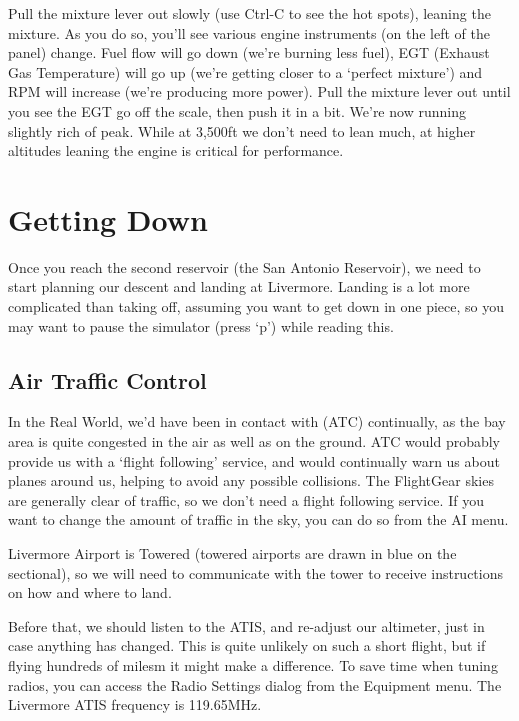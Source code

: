 Pull the mixture lever out slowly (use Ctrl-C to see the hot spots),
leaning the mixture. As you do so, you'll see various engine instruments
(on the left of the panel) change. Fuel flow will go down (we're burning
less fuel), EGT (Exhaust Gas Temperature) will go up (we're getting closer
to a `perfect mixture') and RPM will increase (we're producing more power).
Pull the mixture lever out until you see the EGT go off the scale, then
push it in a bit. We're now running slightly rich of peak. While at
3,500ft we don't need to lean much, at higher altitudes leaning the
engine is critical for performance.

\section{Getting Down}

Once you reach the second reservoir (the San Antonio Reservoir),
we need to start planning our descent and landing at Livermore.
Landing is a lot more complicated than taking off, assuming you
want to get down in one piece, so you may want to pause the
simulator (press `p') while reading this.

\subsection{Air Traffic Control}

In the Real World, we'd have been in contact with  (ATC)
continually, as the bay area is quite congested in the air as well as on the ground.
ATC would probably provide us with a `flight following' service, and would continually
warn us about planes around us, helping to avoid any possible collisions.
The FlightGear skies are generally clear of traffic, so we don't need a flight following service.
If you want to change the amount of traffic in the sky, you can do so from the AI menu.

Livermore Airport is Towered (towered airports are drawn in blue on the sectional),
so we will need to communicate with the tower to receive instructions on how and where to land.

Before that, we should listen to the ATIS, and re-adjust our altimeter,
just in case anything has changed. This is quite unlikely on such a short flight,
but if flying hundreds of milesm it might make a difference. To save time when tuning
radios, you can access the Radio Settings dialog from the Equipment menu.
The Livermore ATIS frequency is 119.65MHz.

